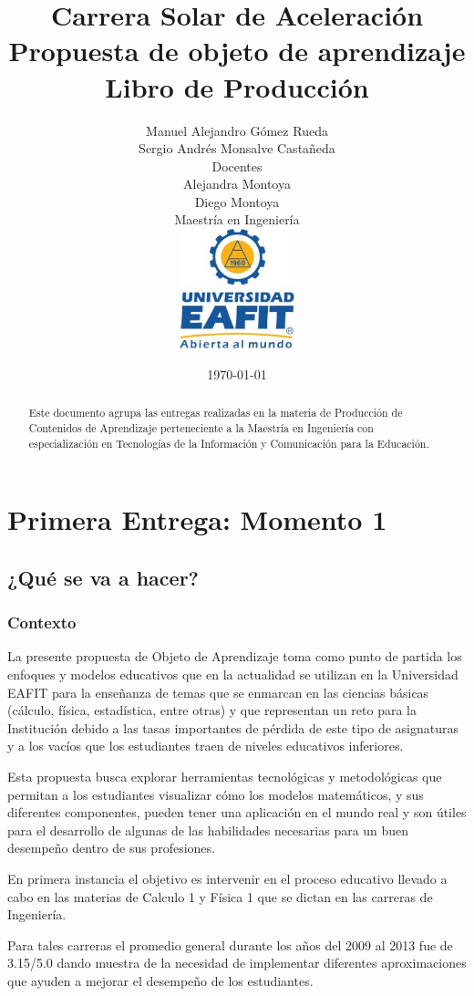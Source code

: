 \documentclass[twoside,letterpaper,11pt]{report}
\title{
Carrera Solar de Aceleración\\
Propuesta de objeto de aprendizaje\\[0.5cm]
Libro de Producción}
\date{\today}
\author{
	Manuel Alejandro Gómez Rueda\\
	Sergio Andrés Monsalve Castañeda \\[2cm]
	Docentes\\[0.5cm]
	Alejandra Montoya\\
	Diego Montoya\\[1cm]
	Maestría en Ingeniería \\[1cm]
	\includegraphics[width=0.25\textwidth]{aux/logo_eafit}
}
\begin{document}
\maketitle

\tableofcontents
\begin{abstract}
Este documento agrupa las entregas realizadas en la materia de Producción de Contenidos de Aprendizaje perteneciente a la Maestría en Ingeniería con especialización en Tecnologías de la Información y Comunicación para la Educación.
\end{abstract}

\chapter{Primera Entrega: Momento 1}

\section{¿Qué se va a hacer?}

\subsection{Contexto} %
\label{sub:contexto}

La presente propuesta de Objeto de Aprendizaje toma como punto de partida los enfoques y modelos educativos que en la actualidad se utilizan en la Universidad EAFIT para la enseñanza de temas que se enmarcan en las ciencias básicas (cálculo, física, estadística, entre otras) y que representan un reto para la Institución debido a las tasas importantes de pérdida de este tipo de asignaturas y a los vacíos que los estudiantes traen de niveles educativos inferiores.

Esta propuesta busca explorar herramientas tecnológicas y metodológicas que permitan a los estudiantes visualizar cómo los modelos matemáticos, y sus diferentes componentes, pueden tener una aplicación en el mundo real y son útiles para el desarrollo de algunas de las habilidades necesarias para un buen desempeño dentro de sus profesiones.

En primera instancia el objetivo es intervenir en el proceso educativo llevado a cabo en las materias de Calculo 1 y Física 1 que se dictan en las carreras de Ingeniería. 

Para tales carreras el promedio general durante los años del 2009 al 2013 fue de 3.15/5.0 dando muestra de la necesidad de implementar diferentes aproximaciones que ayuden a mejorar el desempeño de los estudiantes. 
\end{document}

